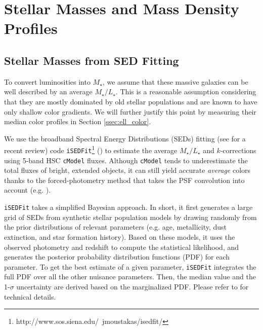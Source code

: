 \documentclass[a4paper,fleqn,usenatbib]{mnras}
\def\cmodel{\texttt{cModel}}
\def\mstar{{$M_{\star}$}}
\def\m2l{{$M_{\star}/L_{\star}$}}
\begin{document}
    
\section{Stellar Masses and Mass Density Profiles}
    \label{sec:mstar}
    
\subsection{Stellar Masses from SED Fitting}
    \label{ssec:isedfit}
   
    To convert luminosities into \mstar{}, we assume that these massive galaxies 
    can be well described by an average \m2l{}. 
    This is a reasonable assumption considering that they are mostly dominated by 
    old stellar populations and are known to have only shallow color gradients. 
    We will further justify this point by measuring their median color profiles in 
    Section \ref{ssec:ell_color}.

    We use the broadband Spectral Energy Distributions (SEDs) fitting 
    (see \citealt{Walcher2011} for a recent review) code 
    \texttt{iSEDFit}\footnote{http://www.sos.siena.edu/~jmoustakas/isedfit/} 
    (\citealt{Moustakas13}) to estimate the average \m2l{} and $k$-corrections using
    5-band HSC \cmodel{} fluxes.
    Although \cmodel{} tends to underestimate the total fluxes of bright, extended 
    objects, it can still yield accurate \emph{average} colors thanks to the 
    forced-photometry method that takes the PSF convolution into account
    (e.g. \citealt{SynPipe}). 

    \texttt{iSEDFit} takes a simplified Bayesian approach. 
    In short, it first generates a large grid of SEDs from synthetic stellar 
    population models by drawing randomly from the prior distributions of relevant
    parameters (e.g. age, metallicity, dust extinction, and star formation history).
    Based on these models, it uses the observed photometry and redshift to compute 
    the statistical likelihood, and generates the posterior probability distribution 
    functions (PDF) for each parameter.  
    To get the best estimate of a given parameter, \texttt{iSEDFit} integrates the 
    full PDF over all the other nuisance parameters.
    Then, the median value and the 1-$\sigma$ uncertainty are derived based on the 
    marginalized PDF. 
    Please refer to \citet{Moustakas13} for technical details. 
    
\end{document}
